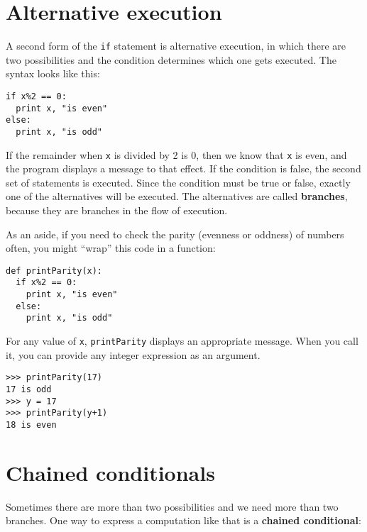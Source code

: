 


\section{Alternative execution}
\label{alternative execution}

A second form of the {\tt if} statement is alternative execution,
in which there are two possibilities and the condition determines
which one gets executed.  The syntax looks like this:

\beforeverb
\begin{verbatim}
if x%2 == 0:
  print x, "is even"
else:
  print x, "is odd"
\end{verbatim}
\afterverb
%
If the remainder when {\tt x} is divided by 2 is 0, then we
know that {\tt x} is even, and the program displays a message to that
effect.  If the condition is false, the second set of statements is
executed.  Since the condition must be true or false, exactly one of
the alternatives will be executed.  The alternatives are called
{\bf branches}, because they are branches in the flow of execution.


As an aside, if you need to check the parity (evenness or
oddness) of numbers often, you might ``wrap'' this code in a
function:

\beforeverb
\begin{verbatim}
def printParity(x):
  if x%2 == 0:
    print x, "is even"
  else:
    print x, "is odd"
\end{verbatim}
\afterverb
%
For any value of {\tt x}, {\tt printParity} displays an
appropriate message.
When you call it, you can provide any integer expression
as an argument.

\beforeverb
\begin{verbatim}
>>> printParity(17)
17 is odd
>>> y = 17
>>> printParity(y+1)
18 is even
\end{verbatim}
\afterverb
%


\section{Chained conditionals}

Sometimes there are more than two possibilities and we need more than
two branches.  One way to express a computation like that is a {\bf
chained conditional}:

